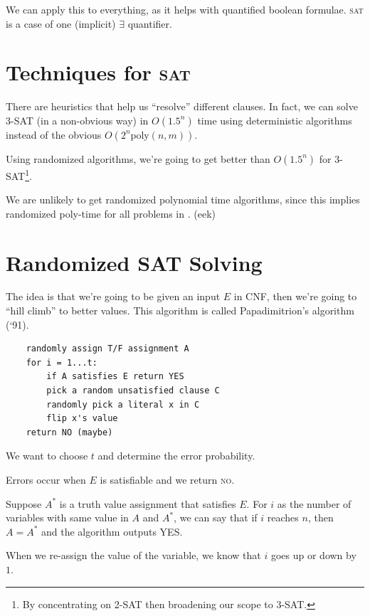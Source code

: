             We can apply this to everything, as it helps with quantified boolean formulae.
            \textsc{sat} is a case of one (implicit) $\exists$ quantifier.

            \section{Techniques for \textsc{sat}} %
            \label{sec:techniques_for_sat}
                There are heuristics that help us ``resolve'' different clauses.
                In fact, we can solve 3-SAT (in a non-obvious way) in $O(1.5^n)$ time using deterministic algorithms instead of the obvious $O(2^n \text{poly}(n, m))$.

                Using randomized algorithms, we're going to get better than $O(1.5^n)$ for 3-SAT\footnote{By concentrating on 2-SAT then broadening our scope to 3-SAT.}.

                We are unlikely to get randomized polynomial time algorithms, since this implies randomized poly-time for all problems in \np. (eek)
            \section{Randomized SAT Solving} %
            \label{sec:randomized_sat_solving}
                The idea is that we're going to be given an input $E$ in CNF, then we're going to ``hill climb'' to better values.
                This algorithm is called Papadimitrion's algorithm (`91).
                \begin{verbatim}
    randomly assign T/F assignment A
    for i = 1...t:
        if A satisfies E return YES
        pick a random unsatisfied clause C
        randomly pick a literal x in C
        flip x's value
    return NO (maybe)
                \end{verbatim}
                We want to choose $t$ and determine the error probability.

                Errors occur when $E$ is satisfiable and we return \textsc{no}.

                Suppose $A^*$ is a truth value assignment that satisfies $E$.
                For $i$ as the number of variables with same value in $A$ and $A^*$, we can say that if $i$ reaches $n$, then $A = A^*$ and the algorithm outputs \textsc{YES}.

                When we re-assign the value of the variable, we know that $i$ goes up or down by $1$.

